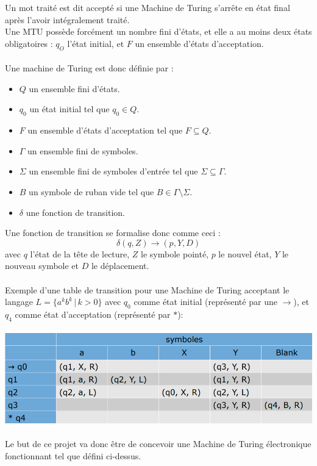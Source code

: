 \documentclass[12pt]{report}
\begin{document}
	 Un mot traité est dit accepté si une Machine de Turing s'arrête en état final après l'avoir intégralement traité.\\
	 Une MTU possède forcément un nombre fini d'états, et elle a au moins deux états obligatoires : $q_O$ l'état initial, et $F$ un ensemble d'états d'acceptation.\\
	 \\
	 Une machine de Turing est donc définie par :\\
	 \begin{itemize}[label=$-$]
	 	\item $Q$ un ensemble fini d'états.\\
	 	\item $q_0$ un état initial tel que $q_0 \in Q$.\\
	 	\item $F$ un ensemble d'états d'acceptation tel que $F \subseteq Q$.\\
	 	\item $\Gamma$ un ensemble fini de symboles.\\
	 	\item $\Sigma$ un ensemble fini de symboles d'entrée tel que $\Sigma \subseteq \Gamma$.\\
	 	\item $B$ un symbole de ruban vide tel que $B \in \Gamma \setminus \Sigma$.
	 	\item $\delta$ une fonction de transition.\\
	\end{itemize}
	 Une fonction de transition se formalise donc comme ceci :\\
	 \[ \delta (q, Z) \to (p, Y, D) \]
	 avec $q$ l'état de la tête de lecture, $Z$ le symbole pointé, $p$ le nouvel état, $Y$ le nouveau symbole et $D$ le déplacement. \cite{mt_wikip}\\
	 \\
	 Exemple d'une table de transition pour une Machine de Turing acceptant le langage $L = \lbrace a^kb^k \, \vert \, k > 0 \rbrace$ avec $q_0$ comme état initial (représenté par une $\to$), et $q_4$ comme état d'acceptation (représenté par $\ast$):\\
	 \\
	 \includegraphics[width=\textwidth]{img/fig1}
	 \\
	 \\
	 Le but de ce projet va donc être de concevoir une Machine de Turing électronique fonctionnant tel que défini ci-dessus.
\end{document}
